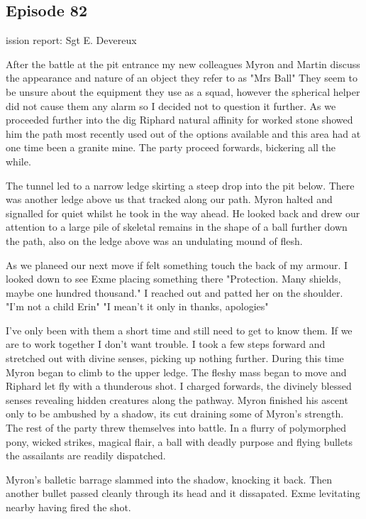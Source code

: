 \subsection{Episode 82}

ission report: Sgt E. Devereux\medskip

After the battle at the pit entrance my new colleagues Myron and Martin discuss the appearance and nature of an object they refer to as "Mrs Ball" They seem to be unsure about the equipment they use as a squad, however the spherical helper did not cause them any alarm so I decided not to question it further. As we proceeded further into the dig Riphard natural affinity for worked stone showed him the path most recently used out of the options available and this area had at one time been a granite mine. The party proceed forwards, bickering all the while.\medskip

The tunnel led to a narrow ledge skirting a steep drop into the pit below. There was another ledge above us that tracked along our path. Myron halted and signalled for quiet whilst he took in the way ahead. He looked back and drew our attention to a large pile of skeletal remains in the shape of a ball further down the path, also on the ledge above was an undulating mound of flesh.\medskip

As we planeed our next move if felt something touch the back of my armour. I looked down to see Exme placing something there "Protection. Many shields, maybe one hundred thousand." I reached out and patted her on the shoulder. "I'm not a child Erin" "I mean't it only in thanks, apologies"\medskip

I've only been with them a short time and still need to get to know them. If we are to work together I don't want trouble. I took a few steps forward and stretched out with divine senses, picking up nothing further. During this time Myron began to climb to the upper ledge. The fleshy mass began to move and Riphard let fly with a thunderous shot. I charged forwards, the divinely blessed senses revealing hidden creatures along the pathway. Myron finished his ascent only to be ambushed by a shadow, its cut draining some of Myron's strength. The rest of the party threw themselves into battle. In a flurry of polymorphed pony, wicked strikes, magical flair, a ball with deadly purpose and flying bullets the assailants are readily dispatched.\medskip

Myron's balletic barrage slammed into the shadow, knocking it back. Then another bullet passed cleanly through its head and it dissapated. Exme levitating nearby having fired the shot.\medskip


